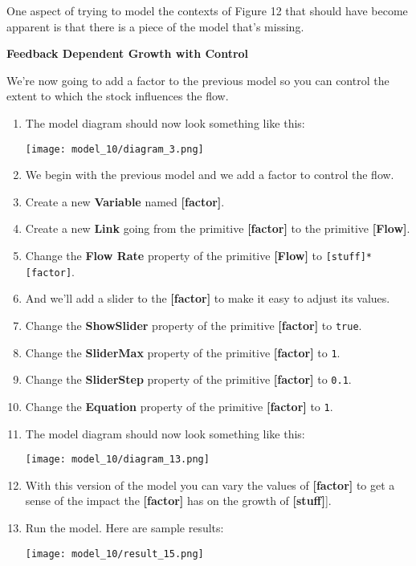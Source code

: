 \documentclass[]{memoir}
\makeatletter
\def\maxwidth{\ifdim\Gin@nat@width>\linewidth\linewidth
\else\Gin@nat@width\fi}
\let\Oldincludegraphics\includegraphics
\renewcommand{\includegraphics}[1]{\Oldincludegraphics[width=\maxwidth]{#1}}
\newcommand{\p}[1]{\textbf{{[}#1{]}}}
\newcommand{\e}[1]{\texttt{#1}}
\renewcommand{\a}[1]{\textbf{#1}}
\makeatother
\begin{document}
One aspect of trying to model the contexts of Figure 12 that should have
become apparent is that there is a piece of the model that's missing.

\FloatBarrier 

\begin{oframed}\textbf{Feedback Dependent Growth with Control} 

 We're now going to add a factor to the previous model so you can control the extent to which the stock influences the flow.

\begin{enumerate}
\item The model diagram should now look something like this: \par \begin{minipage}{\linewidth}  \centering \texttt{[image: model\_10/diagram\_3.png]}
\end{minipage}
\item 

We begin with the previous model and we add a factor to control the flow.


\item Create a new \a{Variable} named \p{factor}.
\item Create a new \a{Link} going from the primitive \p{factor} to the primitive \p{Flow}.
\item  Change the \a{Flow Rate} property of the primitive \p{Flow} to \e{[stuff]*[factor]}.
\item 

And we'll add a slider to the \p{factor} to make it easy to adjust its values.


\item  Change the \a{ShowSlider} property of the primitive \p{factor} to \e{true}.
\item  Change the \a{SliderMax} property of the primitive \p{factor} to \e{1}.
\item  Change the \a{SliderStep} property of the primitive \p{factor} to \e{0.1}.
\item  Change the \a{Equation} property of the primitive \p{factor} to \e{1}.
\item The model diagram should now look something like this: \par \begin{minipage}{\linewidth}  \centering \texttt{[image: model\_10/diagram\_13.png]}
\end{minipage}
\item 

With this version of the model you can vary the values of \p{factor} to get a sense of the impact the \p{factor} has on the growth of \p{stuff}].


\item Run the model. Here are sample results:\par \begin{minipage}{\linewidth}  \centering \texttt{[image: model\_10/result\_15.png]}
\end{minipage}

\end{enumerate} \end{oframed}
\end{document}
